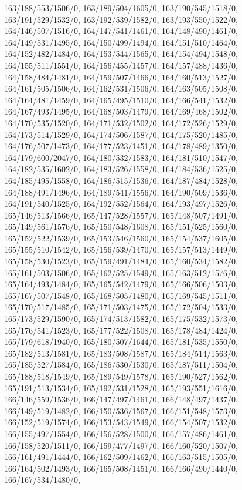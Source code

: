 {163/188/553/1506/0,%
163/189/504/1605/0,%
163/190/545/1518/0,%
163/191/529/1532/0,%
163/192/539/1582/0,%
163/193/550/1522/0,%
164/146/507/1516/0,%
164/147/541/1461/0,%
164/148/490/1461/0,%
164/149/531/1495/0,%
164/150/499/1494/0,%
164/151/510/1464/0,%
164/152/482/1484/0,%
164/153/544/1565/0,%
164/154/494/1548/0,%
164/155/511/1551/0,%
164/156/455/1457/0,%
164/157/488/1436/0,%
164/158/484/1481/0,%
164/159/507/1466/0,%
164/160/513/1527/0,%
164/161/505/1506/0,%
164/162/531/1506/0,%
164/163/505/1508/0,%
164/164/481/1459/0,%
164/165/495/1510/0,%
164/166/541/1532/0,%
164/167/493/1495/0,%
164/168/503/1479/0,%
164/169/468/1502/0,%
164/170/535/1520/0,%
164/171/532/1502/0,%
164/172/526/1529/0,%
164/173/514/1529/0,%
164/174/506/1587/0,%
164/175/520/1485/0,%
164/176/507/1473/0,%
164/177/523/1451/0,%
164/178/489/1350/0,%
164/179/600/2047/0,%
164/180/532/1583/0,%
164/181/510/1547/0,%
164/182/535/1602/0,%
164/183/526/1558/0,%
164/184/536/1525/0,%
164/185/495/1558/0,%
164/186/515/1536/0,%
164/187/484/1528/0,%
164/188/491/1496/0,%
164/189/541/1556/0,%
164/190/509/1536/0,%
164/191/540/1525/0,%
164/192/552/1564/0,%
164/193/497/1526/0,%
165/146/513/1566/0,%
165/147/528/1557/0,%
165/148/507/1491/0,%
165/149/561/1576/0,%
165/150/548/1608/0,%
165/151/525/1560/0,%
165/152/522/1539/0,%
165/153/546/1560/0,%
165/154/537/1605/0,%
165/155/510/1542/0,%
165/156/539/1470/0,%
165/157/513/1449/0,%
165/158/530/1523/0,%
165/159/491/1484/0,%
165/160/534/1582/0,%
165/161/503/1506/0,%
165/162/525/1549/0,%
165/163/512/1576/0,%
165/164/493/1484/0,%
165/165/542/1479/0,%
165/166/506/1503/0,%
165/167/507/1548/0,%
165/168/505/1480/0,%
165/169/545/1511/0,%
165/170/517/1485/0,%
165/171/503/1475/0,%
165/172/504/1533/0,%
165/173/529/1590/0,%
165/174/513/1582/0,%
165/175/532/1573/0,%
165/176/541/1523/0,%
165/177/522/1508/0,%
165/178/484/1424/0,%
165/179/618/1940/0,%
165/180/507/1644/0,%
165/181/535/1550/0,%
165/182/513/1581/0,%
165/183/508/1587/0,%
165/184/514/1563/0,%
165/185/527/1584/0,%
165/186/530/1530/0,%
165/187/511/1504/0,%
165/188/518/1549/0,%
165/189/549/1578/0,%
165/190/527/1562/0,%
165/191/513/1534/0,%
165/192/531/1528/0,%
165/193/551/1616/0,%
166/146/559/1536/0,%
166/147/497/1461/0,%
166/148/497/1437/0,%
166/149/519/1482/0,%
166/150/536/1567/0,%
166/151/548/1573/0,%
166/152/519/1574/0,%
166/153/543/1549/0,%
166/154/507/1532/0,%
166/155/497/1554/0,%
166/156/528/1500/0,%
166/157/486/1461/0,%
166/158/520/1511/0,%
166/159/477/1497/0,%
166/160/520/1507/0,%
166/161/491/1444/0,%
166/162/509/1462/0,%
166/163/515/1505/0,%
166/164/502/1493/0,%
166/165/508/1451/0,%
166/166/490/1440/0,%
166/167/534/1480/0,%
}
